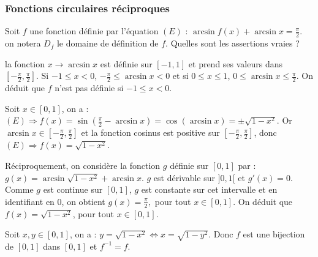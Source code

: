 \subsubsection{Fonctions circulaires réciproques}




\begin{question} 
Soit $f$ une fonction définie par l'équation $(E)$ : $ \arcsin f(x) + \arcsin x = \frac{\pi}{2}$. on notera $D_f$ le domaine de définition de $f$. Quelles sont les assertions vraies ?
\begin{answers}



\end{answers}
\begin{explanations}

\end{explanations}
la fonction $x \to \arcsin x$ est définie sur $[-1,1]$ et prend ses valeurs dans $[-\frac{\pi}{2}, \frac{\pi}{2}]$. Si $-1\le x <0$, $-\frac{\pi}{2}  \le  \arcsin x <0$ et si $0\le  x \le 1$, $0\le   \arcsin x \le  \frac{\pi}{2}$. On déduit que $f$ n'est pas définie si  $-1\le x <0$.

Soit $x \in [0,1]$, on a : $(E) \Rightarrow f(x)= \sin (\frac{\pi}{2} - \arcsin x) = \cos (\arcsin x) = \pm \sqrt{1-x^2} $. Or $\arcsin x \in [-\frac{\pi}{2}, \frac{\pi}{2}] $ et la fonction cosinus est positive sur $[-\frac{\pi}{2}, \frac{\pi}{2}] $, donc $(E) \Rightarrow f(x)= \sqrt{1-x^2}$. 

Réciproquement, on considère la fonction $g$ définie sur $[0,1]$ par : $g(x) =  \arcsin  \sqrt{1-x^2} + \arcsin x$. $g$ est dérivable sur $]0,1[$ et $g'(x)= 0$. Comme $g$ est continue sur $[0,1]$,  $g$ est constante sur cet intervalle et en identifiant en $0$, on obtient $g(x)= \frac{\pi}{2},$ pour tout $x \in [0,1]$. On déduit que $f(x) = \sqrt{1-x^2}$, pour tout $x \in [0,1]$. 

Soit $x, y \in [0,1]$, on a : $y=\sqrt{1-x^2} \Leftrightarrow x = \sqrt{1-y^2}$. Donc $f$ est une bijection de $[0,1]$ dans $[0,1]$ et $f^{-1} = f$.
\end{question}





